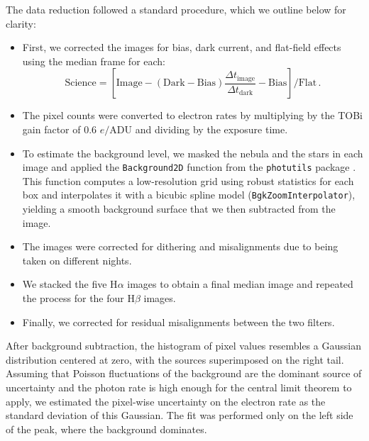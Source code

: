 \documentclass[fleqn,usenatbib]{mnras}
\begin{document}
The data reduction followed a standard procedure, which we outline below for clarity:
\begin{itemize}[left=6pt]
  \item First, we corrected the images for bias, dark current, and flat-field effects using the median frame for each:
  \begin{equation}
    \text{Science} = \left[ \text{Image} - \left(\text{Dark} - \text{Bias}\right) \dfrac{\Delta t_\text{image}}{\Delta t_\text{dark}} - \text{Bias} \right] / \text{Flat} \, .
    \label{eq:data_reduction}
  \end{equation}
  \item The pixel counts were converted to electron rates by multiplying by the TOBi gain factor of $0.6$ $e/$ADU and dividing by the exposure time.
  \item To estimate the background level, we masked the nebula and the stars in each image and applied the \texttt{Background2D} function from the \texttt{photutils} package \citep{Bradley_2024}.
  This function computes a low-resolution grid using robust statistics for each box and interpolates it with a bicubic spline model (\texttt{BgkZoomInterpolator}), yielding a smooth background surface that we then subtracted from the image.
  \item The images were corrected for dithering and misalignments due to being taken on different nights.
  \item We stacked the five H$\alpha$ images to obtain a final median image and repeated the process for the four H$\beta$ images.
  \item Finally, we corrected for residual misalignments between the two filters.
\end{itemize}

After background subtraction, the histogram of pixel values resembles a Gaussian distribution centered at zero, with the sources superimposed on the right tail. 
Assuming that Poisson fluctuations of the background are the dominant source of uncertainty and the photon rate is high enough for the central limit theorem to apply, we estimated the pixel-wise uncertainty on the electron rate as the standard deviation of this Gaussian.
The fit was performed only on the left side of the peak, where the background dominates.
\smallskip
\end{document}
